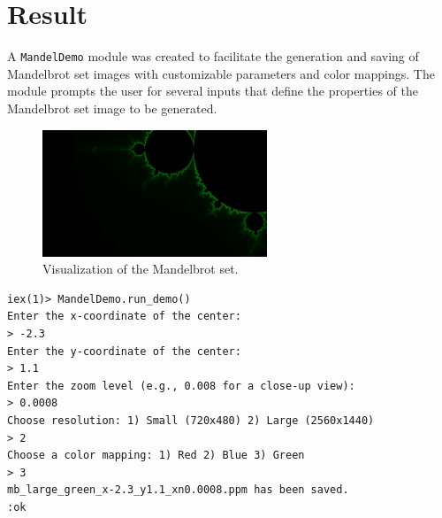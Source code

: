 \documentclass[a4paper,11pt]{article}
\newenvironment{longlisting}{\captionsetup{type=listing}}{}
\begin{document}
\section*{Result}
\label{sec:result}
A
\texttt{MandelDemo} module was created to facilitate the generation and saving of Mandelbrot set images
with customizable parameters and color mappings.
The module prompts the user for several inputs that define the properties of the Mandelbrot set image to be generated.
\begin{figure}[h!]
    \centering
    \includegraphics[width=0.6\textwidth]{../images/mb_large_green_x-2.3_y1.1_xn0.0008.png}
    \caption{Visualization of the Mandelbrot set.}
    \label{fig:mandelbrot1}
\end{figure}
\begin{longlisting}
\begin{verbatim}
iex(1)> MandelDemo.run_demo()
Enter the x-coordinate of the center:
> -2.3
Enter the y-coordinate of the center:
> 1.1
Enter the zoom level (e.g., 0.008 for a close-up view):
> 0.0008
Choose resolution: 1) Small (720x480) 2) Large (2560x1440)
> 2
Choose a color mapping: 1) Red 2) Blue 3) Green
> 3
mb_large_green_x-2.3_y1.1_xn0.0008.ppm has been saved.
:ok
\end{verbatim}
\caption{The prompt that generated figure~\ref{fig:mandelbrot1}
}
\label{listing:demo1}
\end{longlisting}
\end{document}
